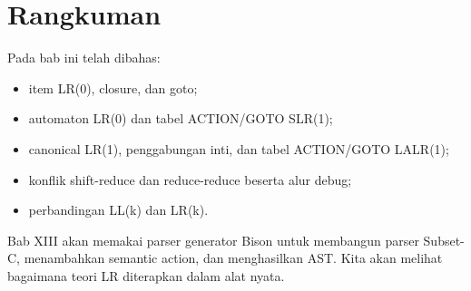 \section*{Rangkuman}

Pada bab ini telah dibahas:
\begin{itemize}[leftmargin=*]
  \item item LR(0), closure, dan goto;
  \item automaton LR(0) dan tabel ACTION/GOTO SLR(1);
  \item canonical LR(1), penggabungan inti, dan tabel ACTION/GOTO
        LALR(1);
  \item konflik shift-reduce dan reduce-reduce beserta alur debug;
  \item perbandingan LL(k) dan LR(k).
\end{itemize}

Bab XIII akan memakai parser generator Bison untuk membangun parser
Subset-C, menambahkan semantic action, dan menghasilkan AST. Kita
akan melihat bagaimana teori LR diterapkan dalam alat nyata.

